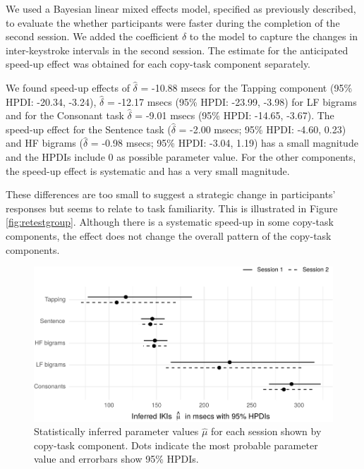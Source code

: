 \documentclass[,man,floatsintext]{apa6}
\begin{document}
We used a Bayesian linear mixed effects model, specified as previously described, to evaluate the whether participants were faster during the completion of the second session. We added the coefficient \(\delta\) to the model to capture the changes in inter-keystroke intervals in the second session. The estimate for the anticipated speed-up effect was obtained for each copy-task component separately.

We found speed-up effects of \(\hat\delta\) = -10.88 msecs for the Tapping component (95\% HPDI: -20.34, -3.24), \(\hat\delta\) = -12.17 msecs (95\% HPDI: -23.99, -3.98) for LF bigrams and for the Consonant task \(\hat\delta\) = -9.01 msecs (95\% HPDI: -14.65, -3.67). The speed-up effect for the Sentence task (\(\hat\delta\) = -2.00 msecs; 95\% HPDI: -4.60, 0.23) and HF bigrams (\(\hat\delta\) = -0.98 msecs; 95\% HPDI: -3.04, 1.19) has a small magnitude and the HPDIs include 0 as possible parameter value. For the other components, the speed-up effect is systematic and has a very small magnitude.

These differences are too small to suggest a strategic change in participants' responses but seems to relate to task familiarity. This is illustrated in Figure \ref{fig:retestgroup}. Although there is a systematic speed-up in some copy-task components, the effect does not change the overall pattern of the copy-task components.

\begin{figure}[!h]

{\centering \includegraphics{ct_files/figure-latex/unnamed-chunk-12-1} 

}

\caption{\label{fig:retestgroup}Statistically inferred parameter values $\hat{\mu}$ for each session shown by copy-task component. Dots indicate the most probable parameter value and errorbars show 95\% HPDIs.}\label{fig:unnamed-chunk-12}
\end{figure}
\end{document}
